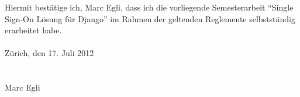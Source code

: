 Hiermit bestätige ich, Marc Egli, dass ich die vorliegende Semesterarbeit ``Single Sign-On Lösung für Django'' im Rahmen der geltenden Reglemente selbstständig erarbeitet habe.\\
\\
Zürich, den 17. Juli 2012\\
\\\\
Marc Egli
